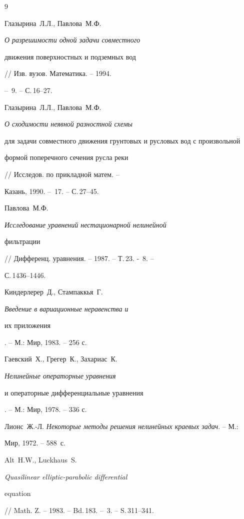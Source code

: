 \begin{thebibliography}{9} 


 




Глазырина~Л.Л., Павлова~М.Ф. {\em О разрешимости одной задачи совместного 


движения поверхностных и подземных вод} // Изв. вузов. Математика. -- 1994. 


-- \No\,9. -- С.\,16--27. 




Глазырина~Л.Л., Павлова~М.Ф. {\em О сходимости неявной разностной схемы 


для задачи совместного движения грунтовых и русловых вод с произвольной 


формой поперечного сечения русла реки} // Исследов. по прикладной матем. -- 


Казань, 1990. -- \No\,17. -- С.\,27--45. 




Павлова~М.Ф. {\em Исследование уравнений нестационарной нелинейной 


фильтрации} // Дифференц. уравнения. -- 1987. -- Т.\,23. - \No\,8. -- 


С.\,1436--1446. 




Киндерлерер~Д., Стампаккья~Г. {\em Введение в вариационные неравенства и 


их приложения}. -- М.: Мир, 1983. -- 256 с. 




Гаевский~Х., Грегер~К., Захариас~К. {\em Нелинейные операторные уравнения 


и операторные дифференциальные уравнения}. -- М.: Мир, 1978. -- 336 с. 




Лионс~Ж.-Л. {\em Некоторые методы решения нелинейных краевых задач}. -- М.: 


Мир, 1972. -- 588~с. 




Alt~H.W., Luckhaus~S. {\em Quasilinear elliptic-parabolic differential 


equation} // Math. Z. -- 1983. -- Bd.\,183. -- \No\,3. -- S.\,311--341. 


 


\end{thebibliography} \par


\vskip 0.5cm 









 


